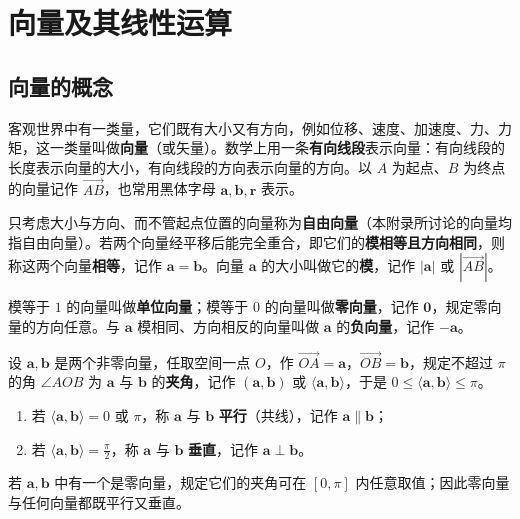 
\section{向量及其线性运算}

\subsection{向量的概念}

客观世界中有一类量，它们既有大小又有方向，例如位移、速度、加速度、力、力矩，这一类量叫做\textbf{向量}（或矢量）。数学上用一条\textbf{有向线段}表示向量：有向线段的长度表示向量的大小，有向线段的方向表示向量的方向。以 $A$ 为起点、$B$ 为终点的向量记作 $\overrightarrow{AB}$，也常用黑体字母 $\boldsymbol{a},\boldsymbol{b},\boldsymbol{r}$ 表示。

\begin{definition}
只考虑大小与方向、而不管起点位置的向量称为\textbf{自由向量}（本附录所讨论的向量均指自由向量）。若两个向量经平移后能完全重合，即它们的\textbf{模相等且方向相同}，则称这两个向量\textbf{相等}，记作 $\boldsymbol{a}=\boldsymbol{b}$。向量 $\boldsymbol{a}$ 的大小叫做它的\textbf{模}，记作 $|\boldsymbol{a}|$ 或 $|\overrightarrow{AB}|$。
\end{definition}

\begin{definition}
模等于 $1$ 的向量叫做\textbf{单位向量}；模等于 $0$ 的向量叫做\textbf{零向量}，记作 $\boldsymbol{0}$，规定零向量的方向任意。与 $\boldsymbol{a}$ 模相同、方向相反的向量叫做 $\boldsymbol{a}$ 的\textbf{负向量}，记作 $-\boldsymbol{a}$。
\end{definition}

\begin{definition}
设 $\boldsymbol{a},\boldsymbol{b}$ 是两个非零向量，任取空间一点 $O$，作 $\overrightarrow{OA}=\boldsymbol{a}$，$\overrightarrow{OB}=\boldsymbol{b}$，规定不超过 $\pi$ 的角 $\angle AOB$ 为 $\boldsymbol{a}$ 与 $\boldsymbol{b}$ 的\textbf{夹角}，记作 $(\boldsymbol{a},\boldsymbol{b})$ 或 $\langle\boldsymbol{a},\boldsymbol{b}\rangle$，于是 $0\le\langle\boldsymbol{a},\boldsymbol{b}\rangle\le\pi$。
\begin{enumerate}
\item 若 $\langle\boldsymbol{a},\boldsymbol{b}\rangle=0$ 或 $\pi$，称 $\boldsymbol{a}$ 与 $\boldsymbol{b}$ \textbf{平行}（共线），记作 $\boldsymbol{a}\parallel\boldsymbol{b}$；
\item 若 $\langle\boldsymbol{a},\boldsymbol{b}\rangle=\frac{\pi}{2}$，称 $\boldsymbol{a}$ 与 $\boldsymbol{b}$ \textbf{垂直}，记作 $\boldsymbol{a}\perp\boldsymbol{b}$。
\end{enumerate}
若 $\boldsymbol{a},\boldsymbol{b}$ 中有一个是零向量，规定它们的夹角可在 $[0,\pi]$ 内任意取值；因此零向量与任何向量都既平行又垂直。
\end{definition}

